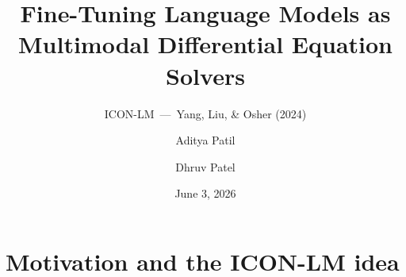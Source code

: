 \documentclass[10pt,aspectratio=169]{beamer}
\title[ICON-LM]{Fine-Tuning Language Models as\\Multimodal Differential Equation Solvers}
\subtitle{ICON-LM \,---\, Yang, Liu, \& Osher (2024)}
\author[]{Aditya Patil \and Dhruv Patel}
\institute[MATH 270A]{MATH 270A Final Project}
\date{June 3, 2026}
\begin{document}

\begin{frame}
  \titlepage
\end{frame}


\section{Motivation and the ICON-LM idea}

\end{document}
